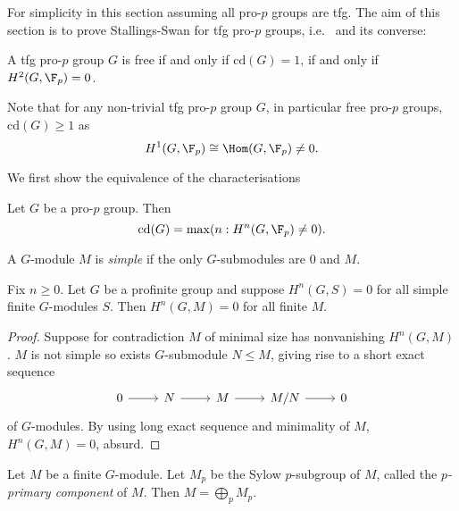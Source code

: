 \documentclass[a4paper]{article}
\begin{document}
For simplicity in this section assuming all pro-\(p\) groups are tfg. The aim of this section is to prove Stallings-Swan for tfg pro-\(p\) groups, i.e.\  and its converse:

\begin{theorem}
  \label{thm:Stallings-Swan for pro-p group}
  A tfg pro-\(p\) group \(G\) is free if and only if \(\mathrm{cd}(G) = 1\), if and only if \(H^2(G, \F_p) = 0\).
\end{theorem}

Note that for any non-trivial tfg pro-\(p\) group \(G\), in particular free pro-\(p\) groups, \(\mathrm{cd}(G) \geq 1\) as
\[
  H^1(G, \F_p) \cong \Hom(G, \F_p) \ne 0.
\]

We first show the equivalence of the characterisations

\begin{theorem}
  Let \(G\) be a pro-\(p\) group. Then
  \[
    \mathrm{cd}(G) = \max(n: H^n(G, \F_p) \ne 0).
  \]
\end{theorem}

\begin{definition}[simple]
  A \(G\)-module \(M\) is \emph{simple} if the only \(G\)-submodules are \(0\) and \(M\).
\end{definition}

\begin{proposition}
  Fix \(n \geq 0\). Let \(G\) be a profinite group and suppose \(H^n(G, S) = 0\) for all simple finite \(G\)-modules \(S\). Then \(H^n(G, M) = 0\) for all finite \(M\).
\end{proposition}

\begin{proof}
  Suppose for contradiction \(M\) of minimal size has nonvanishing \(H^n(G, M)\). \(M\) is not simple so exists \(G\)-submodule \(N \leq M\), giving rise to a short exact sequence
  \[
    \begin{tikzcd}
      0 \ar[r] & N \ar[r] & M \ar[r] & M/N \ar[r] & 0
    \end{tikzcd}
  \]
  of \(G\)-modules. By using long exact sequence and minimality of \(M\), \(H^n(G, M) = 0\), absurd.
\end{proof}

\begin{definition}
  Let \(M\) be a finite \(G\)-module. Let \(M_p\) be the Sylow \(p\)-subgroup of \(M\), called the \emph{\(p\)-primary component} of \(M\). Then \(M = \bigoplus_p M_p\).
\end{definition}
\end{document}
